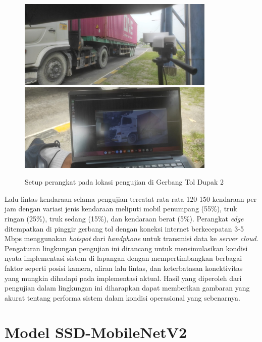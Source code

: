 \begin{figure}[htbp]
  \centering
  \includegraphics[width=0.84\textwidth]{gambar/bab4-test-dupak-kamera.jpeg}
  \includegraphics[width=0.84\textwidth]{gambar/bab4-test-dupak-monitor.jpeg}
  \caption{Setup perangkat pada lokasi pengujian di Gerbang Tol Dupak 2}
  \label{fig:testing_environment}
\end{figure}

Lalu lintas kendaraan selama pengujian tercatat rata-rata 120-150 kendaraan per jam dengan variasi jenis kendaraan meliputi mobil penumpang (55\%), truk ringan (25\%), truk sedang (15\%), dan kendaraan berat (5\%). Perangkat \emph{edge} ditempatkan di pinggir gerbang tol dengan koneksi internet berkecepatan 3-5 Mbps menggunakan \emph{hotspot} dari \emph{handphone} untuk transmisi data ke \emph{server cloud}. Pengaturan lingkungan pengujian ini dirancang untuk mensimulasikan kondisi nyata implementasi sistem di lapangan dengan mempertimbangkan berbagai faktor seperti posisi kamera, aliran lalu lintas, dan keterbatasan konektivitas yang mungkin dihadapi pada implementasi aktual. Hasil yang diperoleh dari pengujian dalam lingkungan ini diharapkan dapat memberikan gambaran yang akurat tentang performa sistem dalam kondisi operasional yang sebenarnya. 

\section{Model SSD-MobileNetV2}
\label{sec:model_ssd_mobilenetv2}

